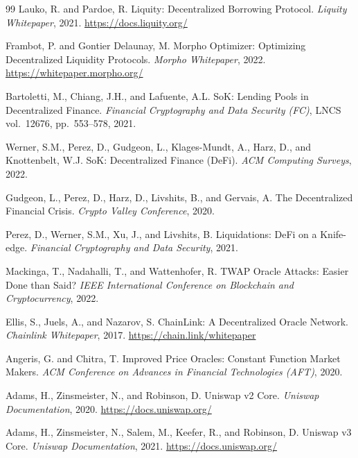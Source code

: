\begin{thebibliography}{99}
Lauko, R. and Pardoe, R.
\newblock Liquity: Decentralized Borrowing Protocol.
\newblock \emph{Liquity Whitepaper}, 2021.
\newblock \url{https://docs.liquity.org/}

Frambot, P. and Gontier Delaunay, M.
\newblock Morpho Optimizer: Optimizing Decentralized Liquidity Protocols.
\newblock \emph{Morpho Whitepaper}, 2022.
\newblock \url{https://whitepaper.morpho.org/}


Bartoletti, M., Chiang, J.H., and Lafuente, A.L.
\newblock SoK: Lending Pools in Decentralized Finance.
\newblock \emph{Financial Cryptography and Data Security (FC)}, LNCS vol.~12676, pp.~553--578, 2021.

Werner, S.M., Perez, D., Gudgeon, L., Klages-Mundt, A., Harz, D., and Knottenbelt, W.J.
\newblock SoK: Decentralized Finance (DeFi).
\newblock \emph{ACM Computing Surveys}, 2022.

Gudgeon, L., Perez, D., Harz, D., Livshits, B., and Gervais, A.
\newblock The Decentralized Financial Crisis.
\newblock \emph{Crypto Valley Conference}, 2020.

Perez, D., Werner, S.M., Xu, J., and Livshits, B.
\newblock Liquidations: DeFi on a Knife-edge.
\newblock \emph{Financial Cryptography and Data Security}, 2021.


Mackinga, T., Nadahalli, T., and Wattenhofer, R.
\newblock TWAP Oracle Attacks: Easier Done than Said?
\newblock \emph{IEEE International Conference on Blockchain and Cryptocurrency}, 2022.

Ellis, S., Juels, A., and Nazarov, S.
\newblock ChainLink: A Decentralized Oracle Network.
\newblock \emph{Chainlink Whitepaper}, 2017.
\newblock \url{https://chain.link/whitepaper}

Angeris, G. and Chitra, T.
\newblock Improved Price Oracles: Constant Function Market Makers.
\newblock \emph{ACM Conference on Advances in Financial Technologies (AFT)}, 2020.

Adams, H., Zinsmeister, N., and Robinson, D.
\newblock Uniswap v2 Core.
\newblock \emph{Uniswap Documentation}, 2020.
\newblock \url{https://docs.uniswap.org/}

Adams, H., Zinsmeister, N., Salem, M., Keefer, R., and Robinson, D.
\newblock Uniswap v3 Core.
\newblock \emph{Uniswap Documentation}, 2021.
\newblock \url{https://docs.uniswap.org/}


\end{thebibliography}
